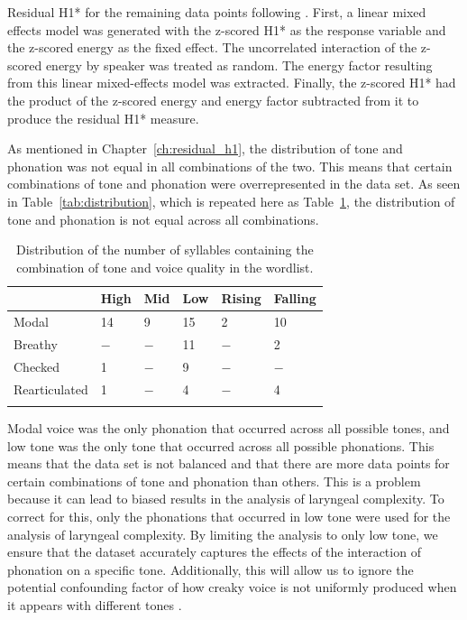 Residual H1* for the remaining data points following \citet{chaiH1H2AcousticMeasure2022}. First, a linear mixed effects model was generated with the z-scored H1* as the response variable and the z-scored energy as the fixed effect. The uncorrelated interaction of the z-scored energy by speaker was treated as random. The energy factor resulting from this linear mixed-effects model was extracted. Finally, the z-scored H1* had the product of the z-scored energy and energy factor subtracted from it to produce the residual H1* measure.

As mentioned in Chapter~\ref{ch:residual_h1}, the distribution of tone and phonation was not equal in all combinations of the two. This means that certain combinations of tone and phonation were overrepresented in the data set. As seen in Table~\ref{tab:distribution}, which is repeated here as Table~\ref{tab:distribution_repeat}, the distribution of tone and phonation is not equal across all combinations. 

\begin{table}[!h]
    \centering
    \caption{Distribution of the number of syllables containing the combination of tone and voice quality in the wordlist.}
    \label{tab:distribution_repeat}
      \begin{tabular}{llllll}
      \lsptoprule
      & High & Mid & Low & Rising & Falling\\
      \hline
      Modal & 14 & 9 & 15 & 2 & 10 \\
      Breathy & $-$ & $-$ & 11 & $-$ & 2 \\
      Checked & 1 & $-$ & 9 & $-$ & $-$ \\
      Rearticulated & 1 & $-$ & 4 & $-$ & 4 \\
      \lspbottomrule
      \end{tabular}
\end{table}

Modal voice was the only phonation that occurred across all possible tones, and low tone was the only tone that occurred across all possible phonations. This means that the data set is not balanced and that there are more data points for certain combinations of tone and phonation than others. This is a problem because it can lead to biased results in the analysis of laryngeal complexity. To correct for this, only the phonations that occurred in low tone were used for the analysis of laryngeal complexity. By limiting the analysis to only low tone, we ensure that the dataset accurately captures the effects of the interaction of phonation on a specific tone. Additionally, this will allow us to ignore the potential confounding factor of how creaky voice is not uniformly produced when it appears with different tones \citep{keatingAcousticPropertiesDifferent2015}.

